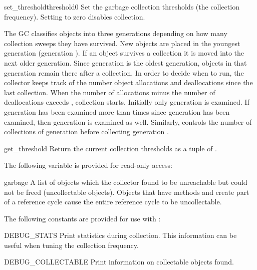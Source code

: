 \begin{funcdesc}{set_threshold}{threshold0}
Set the garbage collection thresholds (the collection frequency).
Setting  to zero disables collection.

The GC classifies objects into three generations depending on how many
collection sweeps they have survived.  New objects are placed in the
youngest generation (generation ).  If an object survives a
collection it is moved into the next older generation.  Since
generation  is the oldest generation, objects in that
generation remain there after a collection.  In order to decide when
to run, the collector keeps track of the number object allocations and
deallocations since the last collection.  When the number of
allocations minus the number of deallocations exceeds
, collection starts.  Initially only generation
 is examined.  If generation  has been examined more
than  times since generation  has been
examined, then generation  is examined as well.  Similarly,
 controls the number of collections of generation
 before collecting generation .
\end{funcdesc}

\begin{funcdesc}{get_threshold}{}
Return the current collection thresholds as a tuple of
.
\end{funcdesc}


The following variable is provided for read-only access:

\begin{datadesc}{garbage}
A list of objects which the collector found to be unreachable
but could not be freed (uncollectable objects).  Objects that have
 methods and create part of a reference cycle cause
the entire reference cycle to be uncollectable.  
\end{datadesc}


The following constants are provided for use with
:

\begin{datadesc}{DEBUG_STATS}
Print statistics during collection.  This information can
be useful when tuning the collection frequency.
\end{datadesc}

\begin{datadesc}{DEBUG_COLLECTABLE}
Print information on collectable objects found.
\end{datadesc}

